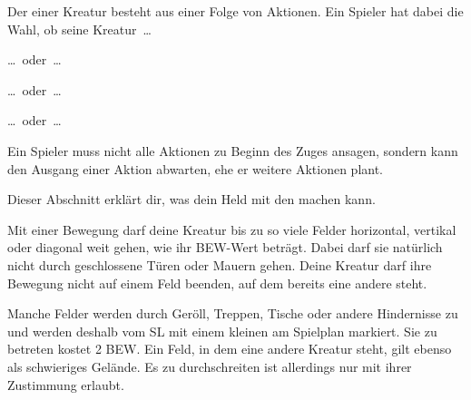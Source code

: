 {		Der  einer Kreatur besteht aus einer Folge von Aktionen. Ein Spieler hat dabei die Wahl, ob seine Kreatur~\ldots


		{\centering\ldots~oder~\ldots}


		{\centering\ldots~oder~\ldots}


		{\centering\ldots~oder~\ldots}


		\noindent
		Ein Spieler muss nicht alle Aktionen zu Beginn des Zuges ansagen, sondern kann den Ausgang einer Aktion abwarten, ehe er weitere Aktionen plant.



		\noindent
		Dieser Abschnitt erklärt dir, was dein Held mit den  machen kann.

			Mit einer Bewegung darf deine Kreatur bis zu so viele Felder horizontal, vertikal oder diagonal weit gehen, wie ihr BEW-Wert beträgt. Dabei darf sie natürlich nicht durch geschlossene Türen oder Mauern gehen. Deine Kreatur darf ihre Bewegung nicht auf einem Feld beenden, auf dem bereits eine andere steht.

			Manche Felder werden durch Geröll, Treppen, Tische oder andere Hindernisse zu  und werden deshalb vom SL mit einem kleinen  am Spielplan markiert. Sie zu betreten kostet 2 BEW. Ein Feld, in dem eine andere Kreatur steht, gilt ebenso als schwieriges Gelände. Es zu durchschreiten ist allerdings nur mit ihrer Zustimmung erlaubt.

}
